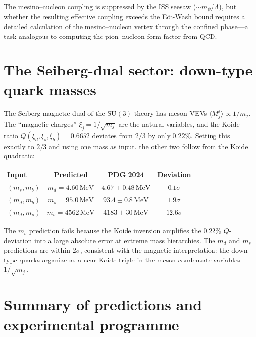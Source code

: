 \documentclass[12pt,a4paper]{article}
\newcommand{\MeV}{\,\text{MeV}}
\begin{document}
The mesino--nucleon coupling is suppressed by the ISS seesaw
($\sim m_\psi / \Lambda$), but whether the resulting effective
coupling exceeds the E\"ot-Wash bound requires a detailed calculation
of the mesino--nucleon vertex through the confined phase---a task
analogous to computing the pion--nucleon form factor from QCD.

\section{The Seiberg-dual sector: down-type quark masses}
\label{sec:dualkoide}

The Seiberg-magnetic dual of the $\mathrm{SU}(3)$ theory has meson
VEVs $\langle M^j_j \rangle \propto 1/m_j$.  The ``magnetic charges''
$\xi_j = 1/\sqrt{m_j}$ are the natural variables, and the Koide
ratio $Q(\xi_d, \xi_s, \xi_b) = 0.6652$ deviates from $2/3$ by only
$0.22\%$.  Setting this exactly to $2/3$ and using one mass as input,
the other two follow from the Koide quadratic:

\begin{center}
\begin{tabular}{lccc}
\toprule
Input & Predicted & PDG 2024 & Deviation \\
\midrule
$(m_s, m_b)$ & $m_d = 4.60\MeV$ & $4.67 \pm 0.48\MeV$ & $0.1\sigma$ \\
$(m_d, m_b)$ & $m_s = 95.0\MeV$ & $93.4 \pm 0.8\MeV$ & $1.9\sigma$ \\
$(m_d, m_s)$ & $m_b = 4562\MeV$ & $4183 \pm 30\MeV$ & $12.6\sigma$ \\
\bottomrule
\end{tabular}
\end{center}

The $m_b$ prediction fails because the Koide inversion amplifies the
$0.22\%$ $Q$-deviation into a large absolute error at extreme mass
hierarchies.  The $m_d$ and $m_s$ predictions are within $2\sigma$,
consistent with the magnetic interpretation: the down-type quarks
organize as a near-Koide triple in the meson-condensate variables
$1/\sqrt{m_j}$.

\section{Summary of predictions and experimental programme}
\label{sec:summary}
\end{document}
